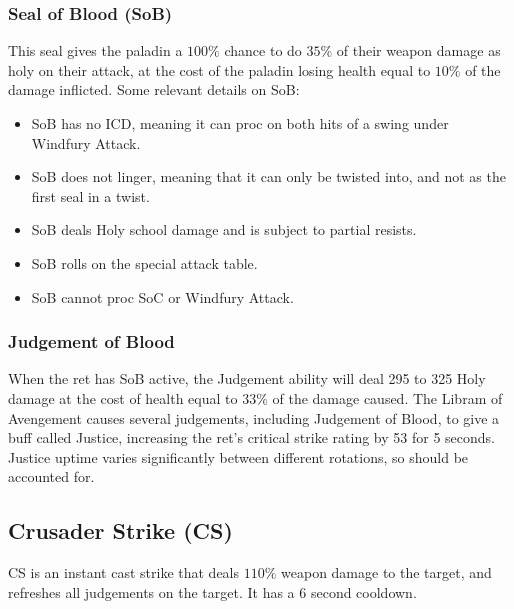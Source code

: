 \documentclass[letterpaper,11pt]{article}
\begin{document}
	\subsubsection{Seal of Blood (SoB)}
	\label{sec:sob}
 	This seal gives the paladin a $100 \%$ chance to do $35 \%$ of their weapon damage as holy on their attack, at the cost of the paladin losing health equal to $10 \%$ of the damage inflicted.
 	Some relevant details on SoB:
	\begin{itemize}
		\item SoB has no ICD, meaning it can proc on both hits of a swing under Windfury Attack.
		\item SoB does not linger, meaning that it can only be twisted into, and not as the first seal in a twist.
		\item SoB deals Holy school damage and is subject to partial resists.
		\item SoB rolls on the special attack table.
		\item SoB cannot proc SoC or Windfury Attack.
	\end{itemize}
 	
	\subsubsection{Judgement of Blood}
	When the ret has SoB active, the Judgement ability will deal 295 to 325 Holy damage at the cost of health equal to $33 \%$ of the damage caused.
	The Libram of Avengement causes several judgements, including Judgement of Blood, to give a buff called Justice, increasing the ret's critical strike rating by 53 for 5 seconds.
	Justice uptime varies significantly between different rotations, so should be accounted for.
	
	\subsection{Crusader Strike (CS)}
	CS is an instant cast strike that deals $110 \%$ weapon damage to the target, and refreshes all judgements on the target.
	It has a 6 second cooldown.
	
	
\end{document}
